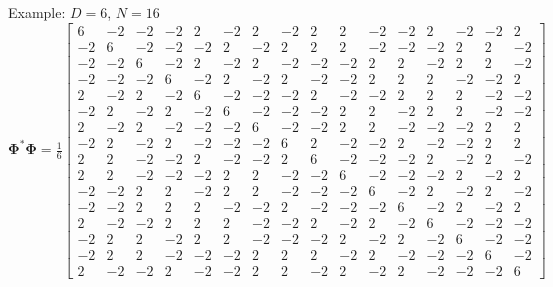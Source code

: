 \documentclass[12pt]{beamer}
\newcommand{\bfPhi}{\boldsymbol{\Phi}}
\begin{document}
\begin{frame}[noframenumbering]{Example: $D=6$, $N=16$}
\footnotesize{
\begin{equation*}
\bfPhi^*\bfPhi=\tfrac{1}{6}\left[\begin{array}{rrrrrrrrrrrrrrrr}
 6  & -2  & -2  & -2  &  2  & -2  &  2  & -2  &  2  &  2  & -2  & -2  &  2  & -2  & -2  &  2\\
-2  &  6  & -2  & -2  & -2  &  2  & -2  &  2  &  2  &  2  & -2  & -2  & -2  &  2  &  2  & -2\\
-2  & -2  &  6  & -2  &  2  & -2  &  2  & -2  & -2  & -2  &  2  &  2  & -2  &  2  &  2  & -2\\
-2  & -2  & -2  &  6  & -2  &  2  & -2  &  2  & -2  & -2  &  2  &  2  &  2  & -2  & -2  &  2\\
 2  & -2  &  2  & -2  &  6  & -2  & -2  & -2  &  2  & -2  & -2  &  2  &  2  &  2  & -2  & -2\\
-2  &  2  & -2  &  2  & -2  &  6  & -2  & -2  & -2  &  2  &  2  & -2  &  2  &  2  & -2  & -2\\
 2  & -2  &  2  & -2  & -2  & -2  &  6  & -2  & -2  &  2  &  2  & -2  & -2  & -2  &  2  &  2\\
-2  &  2  & -2  &  2  & -2  & -2  & -2  &  6  &  2  & -2  & -2  &  2  & -2  & -2  &  2  &  2\\
 2  &  2  & -2  & -2  &  2  & -2  & -2  &  2  &  6  & -2  & -2  & -2  &  2  & -2  &  2  & -2\\
 2  &  2  & -2  & -2  & -2  &  2  &  2  & -2  & -2  &  6  & -2  & -2  & -2  &  2  & -2  &  2\\
-2  & -2  &  2  &  2  & -2  &  2  &  2  & -2  & -2  & -2  &  6  & -2  &  2  & -2  &  2  & -2\\
-2  & -2  &  2  &  2  &  2  & -2  & -2  &  2  & -2  & -2  & -2  &  6  & -2  &  2  & -2  &  2\\
 2  & -2  & -2  &  2  &  2  &  2  & -2  & -2  &  2  & -2  &  2  & -2  &  6  & -2  & -2  & -2\\
-2  &  2  &  2  & -2  &  2  &  2  & -2  & -2  & -2  &  2  & -2  &  2  & -2  &  6  & -2  & -2\\
-2  &  2  &  2  & -2  & -2  & -2  &  2  &  2  &  2  & -2  &  2  & -2  & -2  & -2  &  6  & -2\\
 2  & -2  & -2  &  2  & -2  & -2  &  2  &  2  & -2  &  2  & -2  &  2  & -2  & -2  & -2  &  6
\end{array}\right]
\end{equation*}
}

\end{frame}
\end{document}
